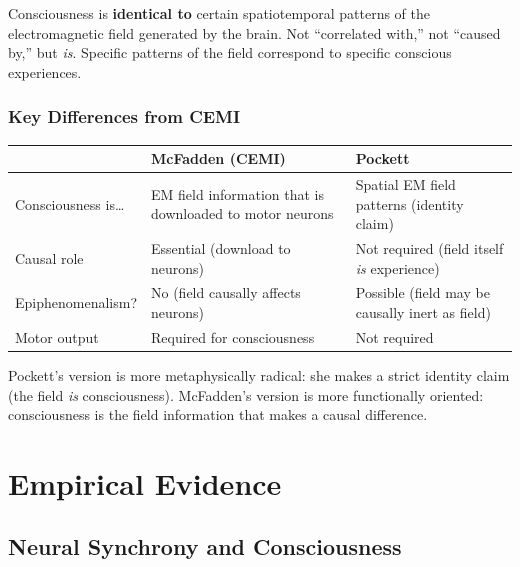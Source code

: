 \documentclass[11pt,a4paper]{report}
\begin{document}
\begin{principlebox}
Consciousness is \textbf{identical to} certain spatiotemporal patterns of the electromagnetic field generated by the brain. Not ``correlated with,'' not ``caused by,'' but \emph{is}. Specific patterns of the field correspond to specific conscious experiences.
\end{principlebox}

\subsection{Key Differences from CEMI}

\begin{center}
\renewcommand{\arraystretch}{1.3}
\begin{tabular}{>{\raggedright}p{3.5cm} >{\raggedright}p{5cm} >{\raggedright\arraybackslash}p{5cm}}
  \toprule
  & \textbf{McFadden (CEMI)} & \textbf{Pockett} \\
  \midrule
  Consciousness is\ldots & EM field information that is downloaded to motor neurons & Spatial EM field patterns (identity claim) \\
  Causal role & Essential (download to neurons) & Not required (field itself \emph{is} experience) \\
  Epiphenomenalism? & No (field causally affects neurons) & Possible (field may be causally inert as field) \\
  Motor output & Required for consciousness & Not required \\
  \bottomrule
\end{tabular}
\end{center}

Pockett's version is more metaphysically radical: she makes a strict identity claim (the field \emph{is} consciousness). McFadden's version is more functionally oriented: consciousness is the field information that makes a causal difference.


\chapter{Empirical Evidence}

\section{Neural Synchrony and Consciousness}
\end{document}
